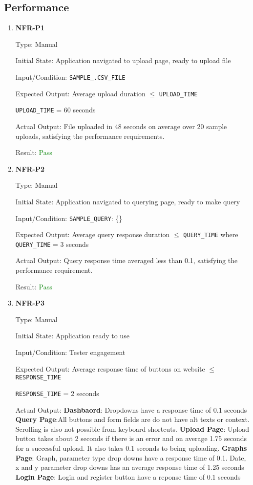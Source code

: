\documentclass[12pt, titlepage]{article}
\begin{document}
\subsection{Performance}
\begin{enumerate}
  \item{\textbf{NFR-P1}} \label{NFR:P1}

Type: Manual

Initial State: Application navigated to upload page, ready to upload file

Input/Condition: \texttt{SAMPLE\_.CSV\_FILE}

Expected Output: Average upload duration $\leq$ \texttt{UPLOAD\_TIME}

\texttt{UPLOAD\_TIME} = 60 seconds

Actual Output: File uploaded in 48 seconds on average over 20 sample uploads,
satisfying the performance requirements.

Result: \textcolor{green}{Pass}

  \item{\textbf{NFR-P2}} \label{NFR:P2}

Type: Manual

Initial State: Application navigated to querying page, ready to make query

Input/Condition: \texttt{SAMPLE\_QUERY}: \{\}

Expected Output: Average query response duration $\leq$ \texttt{QUERY\_TIME}
where \texttt{QUERY\_TIME} = 3 seconds

Actual Output: Query response time averaged less than 0.1, satisfying the
performance requirement.

Result: \textcolor{green}{Pass}

\item{\textbf{NFR-P3}} \label{NFR:P3}

Type: Manual

Initial State: Application ready to use

Input/Condition: Tester engagement

Expected Output: Average response time of buttons on website $\leq$
\texttt{RESPONSE\_TIME}

\texttt{RESPONSE\_TIME} = 2 seconds

Actual Output: \newline
\textbf{Dashbaord}: Dropdowns have a response time of 0.1 seconds \newline
\textbf{Query Page}:All buttons and form fields are do not have alt texts or
context. Scrolling is also not possible from keyboard shortcuts. \newline
\textbf{Upload Page}: Upload button takes about 2 seconds if there is an error
and on average 1.75 seconds for a successful upload. It also takes 0.1 seconds
to being uploading. \newline
\textbf{Graphs Page}: Graph, parameter type drop downs have a response time of
0.1. Date, x and y parameter drop downs has an average response time of 1.25
seconds \newline
\textbf{Login Page}: Login and register button have a reponse time of 0.1
seconds


\end{enumerate}
\end{document}
